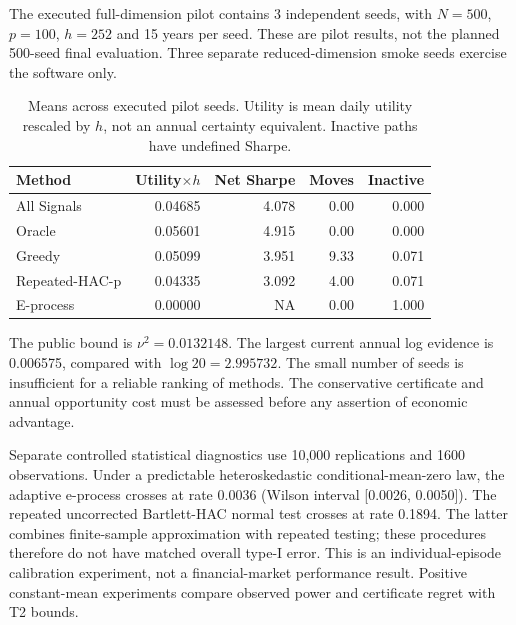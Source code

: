 The executed full-dimension pilot contains 3 independent seeds, with $N=500$, $p=100$, $h=252$ and 15 years per seed. These are pilot results, not the planned 500-seed final evaluation. Three separate reduced-dimension smoke seeds exercise the software only.

\begin{table}[H]\centering\small

\begin{tabular}{lrrrr}

\toprule

Method & Utility$\times h$ & Net Sharpe & Moves & Inactive \\

\midrule

All Signals & 0.04685 & 4.078 & 0.00 & 0.000 \\

Oracle & 0.05601 & 4.915 & 0.00 & 0.000 \\

Greedy & 0.05099 & 3.951 & 9.33 & 0.071 \\

Repeated-HAC-p & 0.04335 & 3.092 & 4.00 & 0.071 \\

E-process & 0.00000 & NA & 0.00 & 1.000 \\

\bottomrule\end{tabular}

\caption{Means across executed pilot seeds. Utility is mean daily utility rescaled by $h$, not an annual certainty equivalent. Inactive paths have undefined Sharpe.}\end{table}

The public bound is $\nu^2=0.0132148$. The largest current annual log evidence is 0.006575, compared with $\log20=2.995732$. The small number of seeds is insufficient for a reliable ranking of methods. The conservative certificate and annual opportunity cost must be assessed before any assertion of economic advantage.

Separate controlled statistical diagnostics use 10,000 replications and 1600 observations. Under a predictable heteroskedastic conditional-mean-zero law, the adaptive e-process crosses at rate 0.0036 (Wilson interval [0.0026, 0.0050]). The repeated uncorrected Bartlett-HAC normal test crosses at rate 0.1894. The latter combines finite-sample approximation with repeated testing; these procedures therefore do not have matched overall type-I error. This is an individual-episode calibration experiment, not a financial-market performance result. Positive constant-mean experiments compare observed power and certificate regret with T2 bounds.

